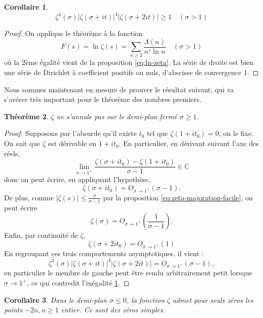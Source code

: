 \documentclass[french]{report}
\newtheorem{theorem}{Théorème}[section]
\newtheorem{corollary}[theorem]{Corollaire}
\begin{document}
\begin{corollary}\label{cor:zeta-inegalite-1}
  \[ \zeta^3(\sigma)|\zeta(\sigma+it)|^4|\zeta(\sigma+2it)|\geq1\quad(\sigma>1) \]  
\end{corollary}

\begin{proof}
  On applique le théorème à la fonction
  \[ F(s) = \ln\zeta(s) = \sum_{n\geq2}\frac{\Lambda(n)}{n^s\ln n}\quad(\sigma>1) \]
  où la 2ème égalité vient de la proposition \ref{eq:ln-zeta}. La série de droite est bien une série de Dirichlet à coefficient positifs ou nuls, d'abscisse de convergence 1.
\end{proof}

Nous sommes maintenant en mesure de prouver le résultat suivant, qui va s'avérer très important pour le théorème des nombres premiers.

\begin{theorem}\label{eq:zeta-non-nul-demi-plan-ferme}
  $\zeta$ ne s'annule pas sur le demi-plan fermé $\sigma\geq1$.
\end{theorem}

\begin{proof}
  Supposons par l'absurde qu'il existe $t_0$ tel que $\zeta(1+it_0)=0$, on le fixe. On sait que $\zeta$ est dérivable en $1+it_0$. En particulier, en dérivant suivant l'axe des réels,
  \[ \lim_{\sigma\to1^+}\frac{\zeta(\sigma+it_0)-\zeta(1+it_0)}{\sigma-1}\in\mathbb{C}\]
  donc on peut écrire, en appliquant l'hypothèse,
  \[ \zeta(\sigma+it_0)=O_{\sigma\to1^+}(\sigma-1). \]
  De plus, comme $|\zeta(s)|\leq\frac{\sigma}{\sigma-1}$ par la proposition \ref{eq:zeta-majoration-facile}, on peut écrire
  \[ \zeta(\sigma) = O_{\sigma\to1^+}\left(\frac{1}{\sigma-1}\right). \]
  Enfin, par continuité de $\zeta$,
  \[ \zeta(\sigma+2it_0) = O_{\sigma\to1^+}(1) \]
  En regroupant ces trois comportements asymptotiques, il vient :
  \[ \zeta^3(\sigma)|\zeta(\sigma+it)|^4|\zeta(\sigma+2it)| = O_{\sigma\to1^+}(\sigma-1), \]
  en particulier le membre de gauche peut être rendu arbitrairement petit lorsque $\sigma\to1^+$, ce qui contredit l'inégalité \ref{cor:zeta-inegalite-1}.
\end{proof}

\begin{corollary}
  Dans le demi-plan $\sigma\leq0$, la fonction $\zeta$ admet pour seuls zéros les points $-2n, n\geq1$ entier. Ce sont des zéros simples.
\end{corollary}
\end{document}
